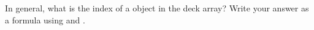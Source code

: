 %

\begin{javalst}
}
\end{javalst}


\Q In general, what is the index of a  object in the deck array?
Write your answer as a formula using  and .

\begin{answer}
\end{answer}
